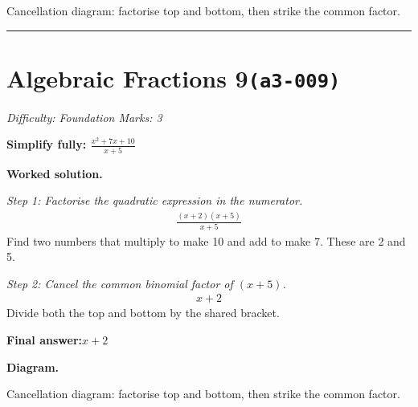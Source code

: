 \documentclass[11pt]{article}
\newcommand{\question}[1]{\par\medskip\noindent\textbf{#1}\par}
\begin{document}
\begin{center}
\end{center}
\small Cancellation diagram: factorise top and bottom, then strike the common factor.\normalsize

\medskip\hrule

\section*{Algebraic Fractions 9\quad\small\texttt{(a3-009)}}
\textit{Difficulty: Foundation \quad\textbar\quad Marks: 3}

\question{Simplify fully: \( \frac{x^2 + 7x + 10}{x + 5} \)}

\textbf{Worked solution.}

\textit{Step 1: Factorise the quadratic expression in the numerator.}
\[\begin{gathered}
\frac{(x + 2)(x + 5)}{x + 5}
\end{gathered}\]
Find two numbers that multiply to make 10 and add to make 7. These are 2 and 5.

\textit{Step 2: Cancel the common binomial factor of \( (x + 5) \).}
\[\begin{gathered}
x + 2
\end{gathered}\]
Divide both the top and bottom by the shared bracket.

\begin{answerbox}
\textbf{Final answer:}\quad \(\displaystyle x + 2\)
\end{answerbox}
\textbf{Diagram.}

\begin{center}
\end{center}
\small Cancellation diagram: factorise top and bottom, then strike the common factor.\normalsize
\end{document}
